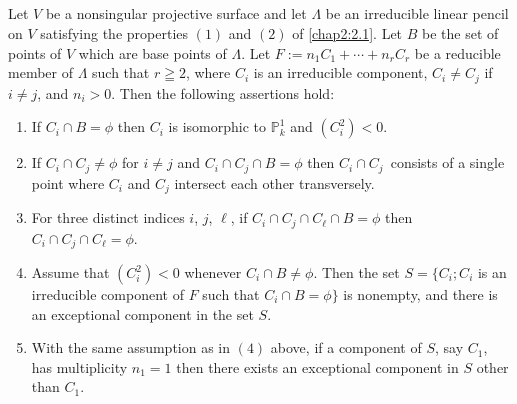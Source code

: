 \subsection{}\label{chap2:2.3}
\begin{lemma*}
  Let $V$ be a nonsingular projective surface and let $\Lambda$ be an
  irreducible linear pencil on $V$ satisfying the properties $(1)$ and
  $(2)$ of \ref{chap2:2.1}. Let $B$ be the set of points of $V$ which are base
  points of $\Lambda$. Let $F:=n_{1}C_{1}+\cdots+n_{r}C_{r}$ be a
  reducible member of $\Lambda$ such that $r\geqq 2$, where $C_{i}$ is
  an irreducible component, $C_{i}\neq C_{j}$ if $i\neq j$, and
  $n_{i}>0$. Then the following assertions hold:
  \begin{enumerate}
    \renewcommand{\labelenumi}{\rm(\theenumi)}
  \item If $C_{i}\cap B=\phi$ then $C_{i}$ is isomorphic to
    $\mathbb{P}^{1}_{k}$ and $(C^{2}_{i})<0$.
    
  \item If $C_{i}\cap C_{j}\neq \phi$ for $i\neq j$ and $C_{i}\cap
    C_{j}\cap B=\phi$ then $C_{i}\cap C_{j}$\pageoriginale\ consists of a
    single point 
    where $C_{i}$ and $C_{j}$ intersect each other transversely.
    
  \item For three distinct indices $i$, $j$, $\ell$, if $C_{i}\cap
    C_{j}\cap C_{\ell}\cap B=\phi$ then $C_{i}\cap C_{j}\cap
    C_{\ell}=\phi$.
    
  \item Assume that $(C^{2}_{i})<0$ whenever $C_{i}\cap B\neq
    \phi$. Then the set $S=\{C_{i};C_{i}$ is an irreducible component of
    $F$ such that $C_{i}\cap B=\phi\}$ is nonempty, and there is an
    exceptional component in the set $S$.
    
  \item With the same assumption as in $(4)$ above, if a component of
    $S$, say $C_{1}$, has multiplicity $n_{1}=1$ then there exists an
    exceptional component in $S$ other than $C_{1}$.
  \end{enumerate}
\end{lemma*}

